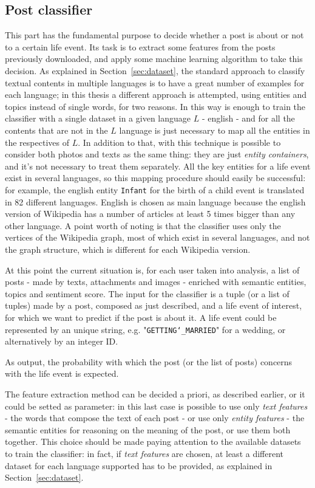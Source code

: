 \subsection{Post classifier}
This part has the fundamental purpose to decide whether a post is about or not to a certain life event. Its task is to extract some features from the posts previously downloaded, and apply some machine learning algorithm to take this decision. As explained in Section~\ref{sec:dataset}, the standard approach to classify textual contents in multiple languages is to have a great number of examples for each language; in this thesis a different approach is attempted, using entities and topics instead of single words, for two reasons. In this way is enough to train the classifier with a single dataset in a given language $ L $ - english - and for all the contents that are not in the $ L $ language is just necessary to map all the entities in the respectives of $L$. In addition to that, with this technique is possible to consider both photos and texts as the same thing: they are just \emph{entity containers}, and it's not necessary to treat them separately. All the key entities for a life event exist in several languages, so this mapping procedure should easily be successful: for example, the english entity \texttt{Infant} for the birth of a child event is translated in 82 different languages. English is chosen as main language because the english version of Wikipedia has a number of articles at least 5 times bigger than any other language. A point worth of noting is that the classifier uses only the vertices of the Wikipedia graph, most of which exist in several languages, and not the graph structure, which is different for each Wikipedia version.

At this point the current situation is, for each user taken into analysis, a list of posts - made by texts, attachments and images - enriched with semantic entities, topics and sentiment score. The input for the classifier is a tuple (or a list of tuples) made by a post, composed as just described, and a life event of interest, for which we want to predict if the post is about it. A life event could be represented by an unique string, e.g. "\texttt{GETTING\char`_MARRIED}" for a wedding, or alternatively by an integer ID.

As output, the probability with which the post (or the list of posts) concerns with the life event is expected.

The feature extraction method can be decided a priori, as described earlier, or it could be setted as parameter: in this last case is possible to use only \emph{text features} - the words that compose the text of each post - or use only \emph{entity features} - the semantic entities for reasoning on the meaning of the post, or use them both together. This choice should be made paying attention to the available datasets to train the classifier: in fact, if \emph{text features} are chosen, at least a different dataset for each language supported has to be provided, as explained in Section~\ref{sec:dataset}.

